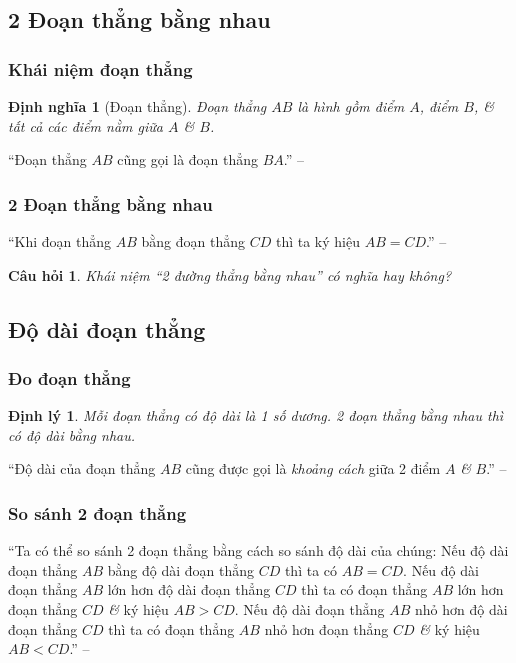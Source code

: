\documentclass[oneside]{book}
\numberwithin{equation}{section}
\newtheorem{dinhnghia}{Định nghĩa}[section]
\newtheorem{cauhoi}{Câu hỏi}[section]
\newtheorem{dinhly}{Định lý}[section]
\begin{document}
\subsection{2 Đoạn thẳng bằng nhau}

\subsubsection{Khái niệm đoạn thẳng}
\begin{dinhnghia}[Đoạn thẳng]
	\emph{Đoạn thẳng $AB$} là hình gồm điểm $A$, điểm $B$, \textit{\&} tất cả các điểm nằm giữa $A$ \textit{\&} $B$.
\end{dinhnghia}
``Đoạn thẳng $AB$ cũng gọi là đoạn thẳng $BA$.'' -- \cite[p. 84]{Thai_Anh_Dat_Ha_Loan_Nam_Quang_Toan_6_tap_2}

\subsubsection{2 Đoạn thẳng bằng nhau}
``Khi đoạn thẳng $AB$ bằng đoạn thẳng $CD$ thì ta ký hiệu $AB = CD$.'' -- \cite[p. 85]{Thai_Anh_Dat_Ha_Loan_Nam_Quang_Toan_6_tap_2}

\begin{cauhoi}
	Khái niệm ``2 đường thẳng bằng nhau'' có nghĩa hay không?
\end{cauhoi}

\subsection{Độ dài đoạn thẳng}

\subsubsection{Đo đoạn thẳng}
\begin{dinhly}
	Mỗi đoạn thẳng có độ dài là 1 số dương. 2 đoạn thẳng bằng nhau thì có độ dài bằng nhau.
\end{dinhly}
``Độ dài của đoạn thẳng $AB$ cũng được gọi là \textit{khoảng cách} giữa 2 điểm $A$ \textit{\&} $B$.'' -- \cite[p. 85]{Thai_Anh_Dat_Ha_Loan_Nam_Quang_Toan_6_tap_2}

\subsubsection{So sánh 2 đoạn thẳng}
``Ta có thể so sánh 2 đoạn thẳng bằng cách so sánh độ dài của chúng: Nếu độ dài đoạn thẳng $AB$ bằng độ dài đoạn thẳng $CD$ thì ta có $AB = CD$. Nếu độ dài đoạn thẳng $AB$ lớn hơn độ dài đoạn thẳng $CD$ thì ta có đoạn thẳng $AB$ lớn hơn đoạn thẳng $CD$ \textit{\&} ký hiệu $AB > CD$. Nếu độ dài đoạn thẳng $AB$ nhỏ hơn độ dài đoạn thẳng $CD$ thì ta có đoạn thẳng $AB$ nhỏ hơn đoạn thẳng $CD$ \textit{\&} ký hiệu $AB < CD$.'' -- \cite[p. 86]{Thai_Anh_Dat_Ha_Loan_Nam_Quang_Toan_6_tap_2}
\end{document}

